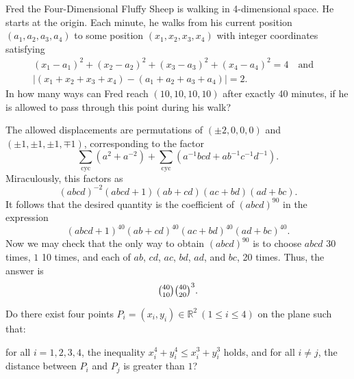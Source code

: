 \documentclass[11pt]{article}
\theoremstyle{definition}
\begin{document}
\begin{question}[name={2019 HMMT, Combinatorics, \href{https://artofproblemsolving.com/community/c129h1786252p11795767}{Problem 10}}]
	Fred the Four-Dimensional Fluffy Sheep is walking in 4-dimensional space. He starts at the origin. Each minute, he walks from his current position $(a_1, a_2, a_3, a_4)$ to some position $(x_1, x_2, x_3, x_4)$ with integer coordinates satisfying
	\begin{multline*}
		(x_1-a_1)^2 + (x_2-a_2)^2 + (x_3-a_3)^2 + (x_4-a_4)^2 = 4 
		\quad \text{and} \quad\\
		|(x_1 + x_2 + x_3 + x_4) - (a_1 + a_2 + a_3 + a_4)| = 2.
	\end{multline*}
	In how many ways can Fred reach $(10, 10, 10, 10)$ after exactly 40 minutes, if he is allowed to pass through this point during his walk?
\end{question}




\begin{solution}[name={Solution by CantonMathGuy}]
	The allowed displacements are permutations of $(\pm 2, 0, 0, 0)$ and $(\pm 1, \pm 1, \pm 1, \mp 1)$, corresponding to the factor
	\[\sum_{\text{cyc}} (a^2 + a^{-2}) + \sum_{\text{cyc}} (a^{-1}bcd + ab^{-1}c^{-1}d^{-1}).\]Miraculously, this factors as
	\[(abcd)^{-2} (abcd + 1)(ab + cd)(ac + bd)(ad + bc).\]It follows that the desired quantity is the coefficient of $(abcd)^{90}$ in the expression
	\[(abcd + 1)^{40} (ab + cd)^{40} (ac + bd)^{40} (ad + bc)^{40}.\]Now we may check that the only way to obtain $(abcd)^{90}$ is to choose $abcd$ 30 times, $1$ 10 times, and each of $ab$, $cd$, $ac$, $bd$, $ad$, and $bc$, 20 times. Thus, the answer is $$\tbinom{40}{10} \tbinom{40}{20}^3.$$
\end{solution}



\begin{question}[name={2019 HMIC, \href{https://artofproblemsolving.com/community/c6h1829628p12247077}{Problem 3}}]
	Do there exist four points $P_i = (x_i, y_i) \in \mathbb{R}^2\ (1\leq i \leq 4)$ on the plane such that:
	\begin{tasks}
		\task for all $i = 1,2,3,4$, the inequality $x_i^4 + y_i^4  \le x_i^3+ y_i^3$ holds, and
		\task for all $i \neq j$, the distance between $P_i$ and $P_j$ is greater than $1$?
	\end{tasks}
\end{question}
\end{document}
